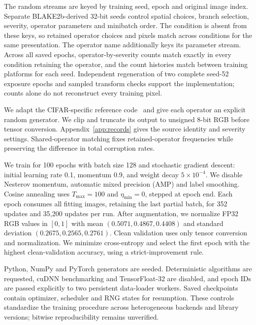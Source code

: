 \documentclass[twoside,a4paper,11pt]{article}
\begin{document}
\FloatBarrier
The random streams are keyed by training seed, epoch and original image index. Separate BLAKE2b-derived 32-bit seeds control spatial choices, branch selection, severity, operator parameters and minibatch order. The condition is absent from these keys, so retained operator choices and pixels match across conditions for the same presentation. The operator name additionally keys its parameter stream. Across all saved epochs, operator-by-severity counts match exactly in every condition retaining the operator, and the count histories match between training platforms for each seed. Independent regeneration of two complete seed-52 exposure epochs and sampled transform checks support the implementation; counts alone do not reconstruct every training pixel.

We adapt the CIFAR-specific reference code~\cite{cifarreference} and give each operator an explicit random generator. We clip and truncate its output to unsigned 8-bit RGB before tensor conversion. Appendix~\ref{app:records} gives the source identity and severity settings. Shared-operator matching fixes retained-operator frequencies while preserving the difference in total corruption rates.


We train for 100 epochs with batch size 128 and stochastic gradient descent: initial learning rate 0.1, momentum 0.9, and weight decay $5\times10^{-4}$. We disable Nesterov momentum, automatic mixed precision (AMP) and label smoothing. Cosine annealing uses $T_{\max}=100$ and $\eta_{\min}=0$, stepped at epoch end. Each epoch consumes all fitting images, retaining the last partial batch, for 352 updates and 35,200 updates per run. After augmentation, we normalize FP32 RGB values in $[0,1]$ with mean $(0.5071,0.4867,0.4408)$ and standard deviation $(0.2675,0.2565,0.2761)$. Clean validation uses only tensor conversion and normalization. We minimize cross-entropy and select the first epoch with the highest clean-validation accuracy, using a strict-improvement rule.

Python, NumPy and PyTorch generators are seeded. Deterministic algorithms are requested, cuDNN benchmarking and TensorFloat-32 are disabled, and epoch IDs are passed explicitly to two persistent data-loader workers. Saved checkpoints contain optimizer, scheduler and RNG states for resumption. These controls standardize the training procedure across heterogeneous backends and library versions; bitwise reproducibility remains unverified.
\end{document}
